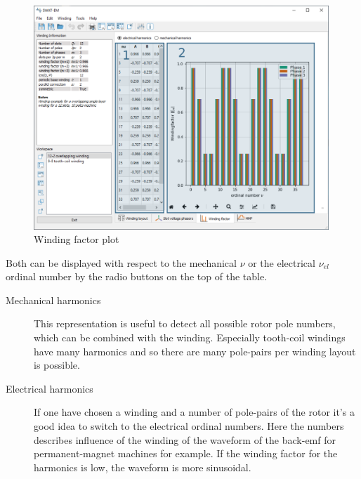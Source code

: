 \documentclass[]{scrreprt}
\begin{document}
%
\begin{figure}[htpb]
    \centering
    \includegraphics[width=0.99\textwidth,angle=0]{fig/mainwindow_windingfactor}
    \caption{Winding factor plot}
    \label{fig:mainwindow_windingfactor}
\end{figure}
%
Both can be displayed with respect to the mechanical $\nu$ or the electrical $\nu_{el}$ ordinal number by
the radio buttons on the top of the table.
\begin{description}
 \item[Mechanical harmonics] This representation is useful to detect all possible rotor pole numbers, which 
                             can be combined with the winding. Especially tooth-coil windings have many 
                             harmonics and so there are many pole-pairs per winding layout is possible. 
 \item[Electrical harmonics] If one have chosen a winding and a number of pole-pairs of the rotor it's
                             a good idea to switch to the electrical ordinal numbers. Here the numbers describes
                             influence of the winding of the waveform of the back-emf for permanent-magnet
                             machines for example. If the winding factor for the harmonics is low, the 
                             waveform is more sinusoidal.
\end{description}
%
%
\end{document}

